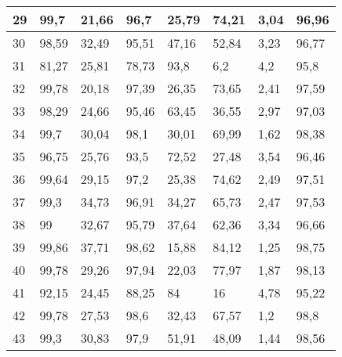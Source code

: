 \begin{longtable}[c]{|l|l|l|l|l|l|l|l|}
29              & 99,7         & 21,66        & 96,7        & 25,79         & 74,21         & 3,04          & 96,96         \\ \hline
30              & 98,59        & 32,49        & 95,51       & 47,16         & 52,84         & 3,23          & 96,77         \\ \hline
31              & 81,27        & 25,81        & 78,73       & 93,8          & 6,2           & 4,2           & 95,8          \\ \hline
32              & 99,78        & 20,18        & 97,39       & 26,35         & 73,65         & 2,41          & 97,59         \\ \hline
33              & 98,29        & 24,66        & 95,46       & 63,45         & 36,55         & 2,97          & 97,03         \\ \hline
34              & 99,7         & 30,04        & 98,1        & 30,01         & 69,99         & 1,62          & 98,38         \\ \hline
35              & 96,75        & 25,76        & 93,5        & 72,52         & 27,48         & 3,54          & 96,46         \\ \hline
36              & 99,64        & 29,15        & 97,2        & 25,38         & 74,62         & 2,49          & 97,51         \\ \hline
37              & 99,3         & 34,73        & 96,91       & 34,27         & 65,73         & 2,47          & 97,53         \\ \hline
38              & 99           & 32,67        & 95,79       & 37,64         & 62,36         & 3,34          & 96,66         \\ \hline
39              & 99,86        & 37,71        & 98,62       & 15,88         & 84,12         & 1,25          & 98,75         \\ \hline
40              & 99,78        & 29,26        & 97,94       & 22,03         & 77,97         & 1,87          & 98,13         \\ \hline
41              & 92,15        & 24,45        & 88,25       & 84            & 16            & 4,78          & 95,22         \\ \hline
42              & 99,78        & 27,53        & 98,6        & 32,43         & 67,57         & 1,2           & 98,8          \\ \hline
43              & 99,3         & 30,83        & 97,9        & 51,91         & 48,09         & 1,44          & 98,56         \\ \hline

\end{longtable}
